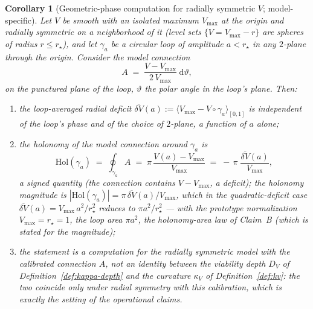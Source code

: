 \documentclass[11pt,a4paper]{article}
\theoremstyle{plain}
\newtheorem{corollary}[theorem]{Corollary}
\theoremstyle{definition}
\theoremstyle{remark}
\newcommand{\kk}{\kappa_{\!V}}
\begin{document}
\begin{corollary}[Geometric-phase computation for radially symmetric
$V$; model-specific]\label{cor:kappa-geometric-phase}
Let $V$ be smooth with an isolated maximum $V_{\max}$ at the origin
and radially symmetric on a neighborhood of it (level sets
$\{V = V_{\max} - r\}$ are spheres of radius $r \le r_\star$), and
let $\gamma_a$ be a circular loop of amplitude $a < r_\star$ in any
$2$-plane through the origin. Consider the model connection
\[
A \;=\; \frac{V - V_{\max}}{2\,V_{\max}}\;\mathrm{d}\vartheta,
\]
on the punctured plane of the loop, $\vartheta$ the polar angle in
the loop's plane. Then:
\begin{enumerate}[leftmargin=*,itemsep=1pt]
\item the loop-averaged radial deficit
$\overline{\delta V}(a) := \langle V_{\max} - V \circ
\gamma_a\rangle_{[0,1]}$ is independent of the loop's phase and of
the choice of $2$-plane, a function of $a$ alone;
\item the holonomy of the model connection around $\gamma_a$ is
\begin{equation}\label{eq:kappa-radial}
  \mathrm{Hol}(\gamma_a) \;=\; \oint_{\gamma_a} A \;=\;
  \pi\,\frac{V(a)-V_{\max}}{V_{\max}}
  \;=\; -\,\pi\;\frac{\overline{\delta V}(a)}{V_{\max}},
\end{equation}
a \emph{signed} quantity (the connection contains $V-V_{\max}$, a
deficit); the holonomy \emph{magnitude} is
$|\mathrm{Hol}(\gamma_a)| = \pi\,\overline{\delta V}(a)/V_{\max}$,
which in the quadratic-deficit case
$\overline{\delta V}(a) = V_{\max}\,a^{2}/r_\star^{2}$ reduces to
$\pi a^{2}/r_\star^{2}$ --- with the prototype normalization
$V_{\max} = r_\star = 1$, the loop area $\pi a^{2}$, the
holonomy-area law of Claim~B (which is stated for the magnitude);
\item the statement is a computation for the radially symmetric model
with the calibrated connection $A$, not an identity between the
viability depth $D_V$ of Definition~\ref{def:kappa-depth} and the
curvature $\kk$ of Definition~\ref{def:kv}: the two coincide only
under radial symmetry with this calibration, which is exactly the
setting of the operational claims.
\end{enumerate}
\end{corollary}
\end{document}
